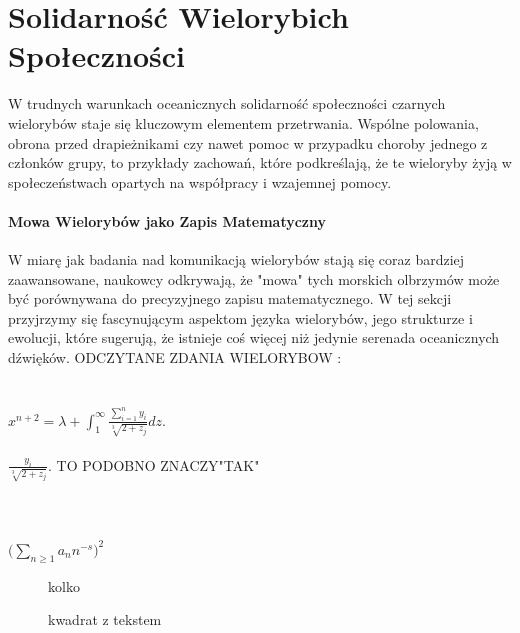 \documentclass{article}
\begin{document}
\section{Solidarność Wielorybich Społeczności}
W trudnych warunkach oceanicznych solidarność społeczności czarnych wielorybów staje się kluczowym elementem przetrwania. Wspólne polowania, obrona przed drapieżnikami czy nawet pomoc w przypadku choroby jednego z członków grupy, to przykłady zachowań, które podkreślają, że te wieloryby żyją w społeczeństwach opartych na współpracy i wzajemnej pomocy.
\paragraph{Mowa Wielorybów jako Zapis Matematyczny}
W miarę jak badania nad komunikacją wielorybów stają się coraz bardziej zaawansowane, naukowcy odkrywają, że "mowa" tych morskich olbrzymów może być porównywana do precyzyjnego zapisu matematycznego. W tej sekcji przyjrzymy się fascynującym aspektom języka wielorybów, jego strukturze i ewolucji, które sugerują, że istnieje coś więcej niż jedynie serenada oceanicznych dźwięków.
\newline
\large{ODCZYTANE ZDANIA WIELORYBOW : }\\
\\\\
$x^{n + 2} = \lambda + \int_{1}^{\infty} \frac{\sum_{i=1}^{n} y_{i}}{\sqrt[3]{2 + z_{j}}} dz.$
\\\\
$ \frac{y_{i}}{\sqrt[3]{2 + z_{j}}}.$ \footnotesize{      TO PODOBNO ZNACZY}"TAK"
\\\\\\\\
$\biggl(\sum_{n\ge 1} a_{n} n^{-s}\biggr)^2$


\begin{figure}[h]
  \centering
  \caption{kolko \cite{jeden}}
  \label{fig:rysunek}
\end{figure}

\begin{figure}[h]
  \centering
  \caption{kwadrat z tekstem \cite{dwa}}
  \label{fig:rysunek-tekst}
\end{figure}
\end{document}
